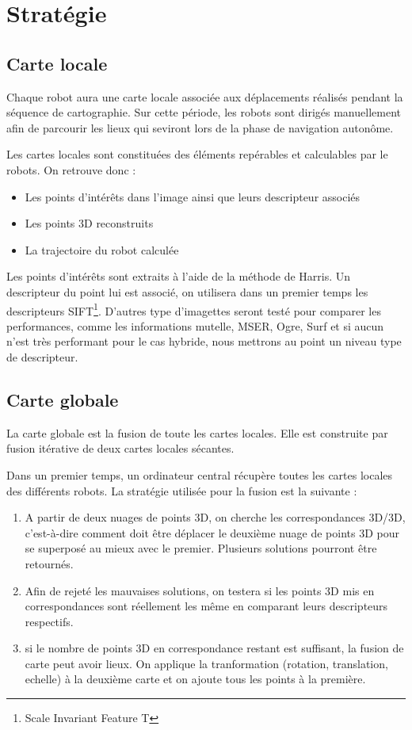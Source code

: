 \section{Stratégie}


\subsection{Carte locale}

Chaque robot aura une carte locale associée aux déplacements réalisés pendant la séquence de cartographie.
Sur cette période, les robots sont dirigés manuellement afin de parcourir les lieux qui seviront lors de la phase de navigation autonôme.

Les cartes locales sont constituées des éléments repérables et calculables par le robots.
On retrouve donc :
\begin{itemize}
\item Les points d'intérêts dans l'image ainsi que leurs descripteur associés
\item Les points 3D reconstruits
\item La trajectoire du robot calculée
\end{itemize}

Les points d'intérêts sont extraits à l'aide de la méthode de Harris.
Un descripteur du point lui est associé, on utilisera dans un premier temps les descripteurs SIFT\footnote{Scale Invariant Feature T}.
D'autres type d'imagettes seront testé pour comparer les performances, comme les informations mutelle, MSER, Ogre, Surf et si aucun n'est très performant pour le cas hybride, nous mettrons au point un niveau type de descripteur.


\subsection{Carte globale}

La carte globale est la fusion de toute les cartes locales.
Elle est construite par fusion itérative de deux cartes locales sécantes.

Dans un premier temps, un ordinateur central récupère toutes les cartes locales des différents robots.
La stratégie utilisée pour la fusion est la suivante :
\begin{enumerate}
\item A partir de deux nuages de points 3D, on cherche les correspondances 3D/3D, c'est-à-dire comment doit être déplacer le deuxième nuage de points 3D pour se superposé au mieux avec le premier.
Plusieurs solutions pourront être retournés.
\item Afin de rejeté les mauvaises solutions, on testera si les points 3D mis en correspondances sont réellement les même en comparant leurs descripteurs respectifs.
\item si le nombre de points 3D en correspondance restant est suffisant, la fusion de carte peut avoir lieux.
On applique la tranformation (rotation, translation, echelle) à la deuxième carte et on ajoute tous les points à la première.
\end{enumerate}

